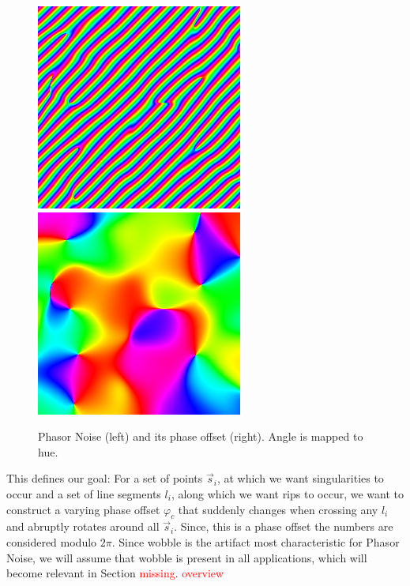 \documentclass{utue} %
\begin{document}
\begin{figure}[ht]
  \centering
  \includegraphics[width=0.45\linewidth]{images/phasorNoise}
  \includegraphics[width=0.45\linewidth]{images/phasorPhase}
  \caption{Phasor Noise (left) and its phase offset (right). Angle is mapped to hue.}\label{fig:phasorNoisePhase}
\end{figure}

This defines our goal: For a set of points $\vec{s}_i$, at which we want singularities to occur and a set of line segments $l_i$, along which we want rips to occur, we want to construct a varying phase offset $\varphi_c$ that suddenly changes when crossing any $l_i$ and abruptly rotates around all $\vec{s}_i$. Since, this is a phase offset the numbers are considered modulo $2\pi$. Since wobble is the artifact most characteristic for Phasor Noise, we will assume that wobble is present in all applications, which will become relevant in Section \textcolor{red}{missing}. \textcolor{red}{overview}
\end{document}
